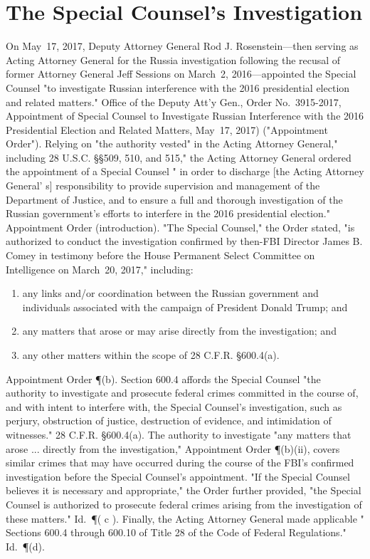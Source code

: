 \section{The Special Counsel's Investigation}

On May~17, 2017, Deputy Attorney General Rod J. Rosenstein---then serving as Acting Attorney General for the Russia investigation following the recusal of former Attorney General Jeff Sessions on March~2, 2016---appointed the Special Counsel "to investigate Russian interference with the 2016 presidential election and related matters."
Office of the Deputy Att'y Gen., Order No.~3915-2017, Appointment of Special Counsel to Investigate Russian Interference with the 2016 Presidential Election and Related Matters, May~17, 2017) ("Appointment Order").
Relying on "the authority vested" in the Acting Attorney General," including 28 U.S.C. \S\S 509, 510, and 515," the Acting Attorney General ordered the appointment of a Special Counsel " in order to discharge [the Acting Attorney General' s] responsibility to provide supervision and management of the Department of Justice, and to ensure a full and thorough investigation of the Russian government's efforts to interfere in the 2016 presidential election." Appointment Order (introduction).
"The Special Counsel," the Order stated, "is authorized to conduct the investigation confirmed by then-FBI Director James B. Comey in testimony before the House Permanent Select Committee on Intelligence on March~20, 2017," including:

\begin{enumerate}[i]
  \item any links and/or coordination between the Russian government and individuals associated with the campaign of President Donald Trump; and
  \item any matters that arose or may arise directly from the investigation; and
  \item any other matters within the scope of 28 C.F.R. \S 600.4(a).
\end{enumerate}

Appointment Order \P (b). Section 600.4 affords the Special Counsel "the authority to investigate and prosecute federal crimes committed in the course of, and with intent to interfere with, the Special Counsel's investigation, such as perjury, obstruction of justice, destruction of evidence, and intimidation of witnesses." 28 C.F.R. \S 600.4(a).
The authority to investigate "any matters that arose ... directly from the investigation," Appointment Order \P (b)(ii), covers similar crimes that may have occurred during the course of the FBI's confirmed investigation before the Special Counsel's appointment.
"If the Special Counsel believes it is necessary and appropriate," the Order further provided, "the Special Counsel is authorized to prosecute federal crimes arising from the investigation of these matters." Id.~\P ( c ).
Finally, the Acting Attorney General made applicable " Sections 600.4 through 600.10 of Title 28 of the Code of Federal Regulations." Id.~\P (d).

